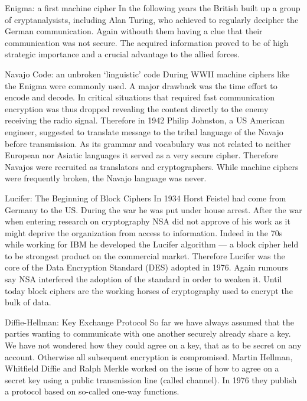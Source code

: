 \documentclass[final,hyperref={pdfpagelabels=false}]{beamer}
\begin{document}
\begin{frame}{}
\begin{columns}[t]
\begin{column}{.3\linewidth}
\begin{block}{Enigma: a first machine cipher}
          In the following years the British built up a group of cryptanalysists, including Alan Turing, who achieved to regularly decipher the German communication. Again withouth them having a clue that their communication was not secure. The acquired information proved to be of high strategic importance and a crucial advantage to the allied forces. 
        \end{block}
        \begin{block}{Navajo Code: an unbroken `linguistic' code}
          During WWII machine ciphers like the Enigma were commonly used. A major drawback was the time effort to encode and decode. In critical situations that required fast communication encryption was thus dropped revealing the content directly to the enemy receiving the radio signal. Therefore in 1942 Philip Johnston, a US American engineer, suggested to translate message to the tribal language of the Navajo before transmission. As its grammar and vocabulary was not related to neither European nor Asiatic languages it served as a very secure cipher. Therefore Navajos were recruited as translators and cryptographers. While machine ciphers were frequently broken, the Navajo language was never.
        \end{block}

        \begin{block}{Lucifer: The Beginning of Block Ciphers}
          In 1934 Horst Feistel had come from Germany to the US. During the war he was put under house arrest. After the war when entering research on cryptography NSA did not approve of his work as it might deprive the organization from access to information. Indeed in the 70s while working for IBM he developed the Lucifer algorithm --- a block cipher held to be strongest product on the commercial market. Therefore Lucifer was the core of the Data Encryption Standard (DES) adopted in 1976. Again rumours say NSA interfered the adoption of the standard in order to weaken it. Until today block ciphers are the working horses of cryptography used to encrypt the bulk of data.
        \end{block}

        \begin{block}{Diffie-Hellman: Key Exchange Protocol}
          So far we have always assumed that the parties wanting to communicate with one another securely already share a key. We have not wondered how they could agree on a key, that as to be secret on any account. Otherwise all subsequent encryption is compromised. Martin Hellman, Whitfield Diffie and Ralph Merkle worked on the issue of how to agree on a secret key using a public transmission line (called channel). In 1976 they publish a protocol based on so-called one-way functions.
        \end{block}


\end{column}
\end{columns}
\end{frame}
\end{document}
